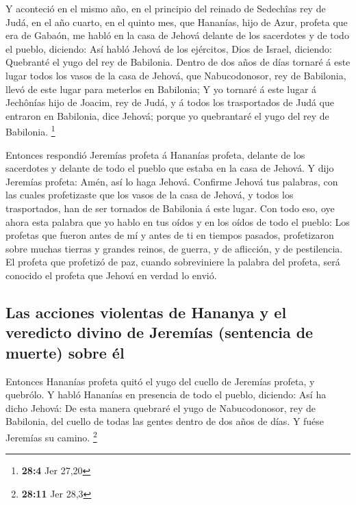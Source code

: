  Y aconteció en el mismo año, en el principio del reinado
de Sedechîas rey de Judá, en el año cuarto, en el quinto mes, que
Hananías, hijo de Azur, profeta que era de Gabaón, me habló en la casa
de Jehová delante de los sacerdotes y de todo el pueblo, diciendo:
 Así habló Jehová de los ejércitos, Dios de Israel,
diciendo: Quebranté el yugo del rey de Babilonia.  Dentro
de dos años de días tornaré á este lugar todos los vasos de la casa de
Jehová, que Nabucodonosor, rey de Babilonia, llevó de este lugar para
meterlos en Babilonia;  Y yo tornaré á este lugar á
Jechônías hijo de Joacim, rey de Judá, y á todos los trasportados de
Judá que entraron en Babilonia, dice Jehová; porque yo quebrantaré el
yugo del rey de Babilonia. \footnote{\textbf{28:4} Jer 27,20}

 Entonces respondió Jeremías profeta á Hananías profeta,
delante de los sacerdotes y delante de todo el pueblo que estaba en la
casa de Jehová.  Y dijo Jeremías profeta: Amén, así lo
haga Jehová. Confirme Jehová tus palabras, con las cuales profetizaste
que los vasos de la casa de Jehová, y todos los trasportados, han de ser
tornados de Babilonia á este lugar.  Con todo eso, oye
ahora esta palabra que yo hablo en tus oídos y en los oídos de todo el
pueblo:  Los profetas que fueron antes de mí y antes de ti
en tiempos pasados, profetizaron sobre muchas tierras y grandes reinos,
de guerra, y de aflicción, y de pestilencia.  El profeta
que profetizó de paz, cuando sobreviniere la palabra del profeta, será
conocido el profeta que Jehová en verdad lo envió.

\hypertarget{las-acciones-violentas-de-hananya-y-el-veredicto-divino-de-jeremuxedas-sentencia-de-muerte-sobre-uxe9l}{%
\subsection{Las acciones violentas de Hananya y el veredicto divino de
Jeremías (sentencia de muerte) sobre
él}\label{las-acciones-violentas-de-hananya-y-el-veredicto-divino-de-jeremuxedas-sentencia-de-muerte-sobre-uxe9l}}

 Entonces Hananías profeta quitó el yugo del cuello de
Jeremías profeta, y quebrólo.  Y habló Hananías en
presencia de todo el pueblo, diciendo: Así ha dicho Jehová: De esta
manera quebraré el yugo de Nabucodonosor, rey de Babilonia, del cuello
de todas las gentes dentro de dos años de días. Y fuése Jeremías su
camino. \footnote{\textbf{28:11} Jer 28,3}

